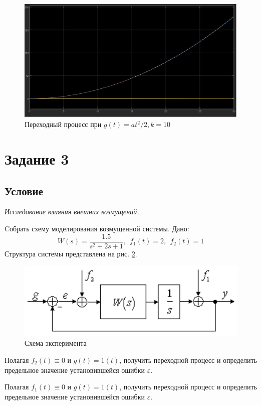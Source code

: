 \documentclass[a4paper, 12pt]{article}
\begin{document}
    \begin{figure}[H]
        \centering
        \includegraphics[scale=0.3]{task_2_g=at2_k=10.jpg}
        \captionsetup{skip=0pt}
        \caption{Переходный процесс при $g(t)=at^2/2,k=10$}
        \label{fig:t2gat2k10}
    \end{figure}


    \section{Задание 3}
    \subsection{Условие}
    \textit{Исследование влияния внешних возмущений.}
    \begin{compactitem}
        \item Cобрать схему моделирования возмущенной системы. Дано:
        $$W(s)=\dfrac{1.5}{s^2+2s+1},\ \ f_1(t)=2,\ \ f_2(t)=1$$
        Структура системы представлена на рис. \ref{fig:struct_scheme3}.
        \begin{figure}[H]
            \centering
            \includegraphics[scale=0.75]{struct_scheme3.png}
            \captionsetup{skip=0pt}
            \caption{Схема эксперимента}
            \label{fig:struct_scheme3}
        \end{figure}
        \item Полагая $f_2(t)\equiv0$ и $g(t)=1(t)$, получить переходной процесс и определить
        предельное значение установившейся ошибки $\varepsilon$.
        \item Полагая $f_1(t)\equiv0$ и $g(t)=1(t)$, получить переходной процесс и определить
        предельное значение установившейся ошибки $\varepsilon$.
    \end{compactitem}
\end{document}
